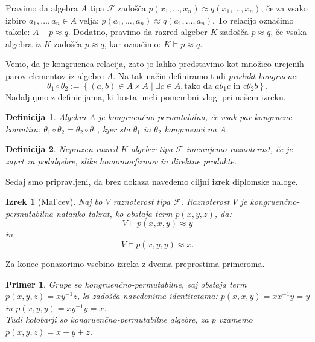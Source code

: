 \documentclass[a4paper,11pt]{article}
\newtheorem{izrek}{Izrek}
\newtheorem{definicija}{Definicija}
\newtheorem{primer}{Primer}
\begin{document}
Pravimo da algebra $A$ tipa $\mathcal{F}$ zadošča $p\left(x_1, \ldots, x_n\right)\approx q\left(x_1, \ldots, x_n\right)$,
če za vsako izbiro $a_1, \ldots, a_n \in A$ velja: $p\left(a_1, \ldots, a_n\right) \approx q\left(a_1, 
\ldots, a_n\right)$. To relacijo označimo takole: $A \models p \approx q$. Dodatno, pravimo da razred algeber $K$ 
zadošča $p \approx q$, če vsaka algebra iz $K$ zadošča $p \approx q$, kar označimo: $K \models p \approx q$.



Vemo, da je kongruenca relacija, zato jo lahko predstavimo kot množico urejenih parov elementov iz algebre $A$. 
Na tak način definiramo tudi \emph{produkt kongruenc}:
    $$\theta_1 \circ \theta_2 := \left\{\left(a, b\right) \in A \times A \mathrel{|} \exists c \in A, \text{tako da } 
    a \mathrel{\theta_1} c \text{ in } c \mathrel{\theta_2} b\right\}.$$
    Nadaljujmo z definicijama, ki bosta imeli pomembni vlogi pri našem izreku.

\begin{definicija}
    Algebra $A$ je \emph{kongruenčno-permutabilna}, če vsak par kongruenc komutira: $\theta_1 \circ \theta_2 =
    \theta_2 \circ \theta_1$, kjer sta $\theta_1$ in $\theta_2$ kongruenci na A. 
\end{definicija}

\begin{definicija}
    Neprazen razred $K$ algeber tipa $\mathcal{F}$ imenujemo \emph{raznoterost}, če je zaprt za podalgebre, 
    slike homomorfizmov in direktne produkte.
\end{definicija}

Sedaj smo pripravljeni, da brez dokaza navedemo ciljni izrek diplomske naloge.

\begin{izrek}[Mal'cev] Naj bo $V$ raznoterost tipa $\mathcal{F}$. Raznoterost $V$ je kongruenčno-permutabilna
    natanko takrat, ko obstaja term $p\left(x, y, z\right)$, da: \\ $$V \models p\left(x,x,y\right)\approx y$$ 
    in $$V \models p\left(x,y,y\right)\approx x.$$   
\end{izrek}

Za konec ponazorimo vsebino izreka z dvema preprostima primeroma. \nocite{Burris_Sankappanavar_1981}

\begin{primer}
    Grupe so kongruenčno-permutabilne, saj obstaja term $p(x,y,z)=xy^{-1}z$, ki zadošča navedenima identitetama:
    $p(x,x,y)= xx^{-1}y=y$ in $p(x, y, y)=xy^{-1}y=x$.\\
    Tudi kolobarji so kongruenčno-permutabilne algebre, za $p$ vzamemo $p(x,y,z)= x-y+z$.
\end{primer}

\printbibliography
\end{document}
